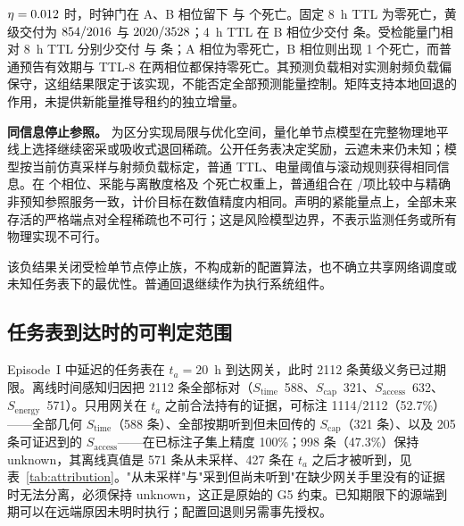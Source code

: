 \documentclass[11pt]{article}
\newcommand{\stime}{$S_{\mathrm{time}}$\xspace}
\newcommand{\scap}{$S_{\mathrm{cap}}$\xspace}
\newcommand{\senergy}{$S_{\mathrm{energy}}$\xspace}
\newcommand{\saccess}{$S_{\mathrm{access}}$\xspace}
\begin{document}
$\eta=0.012$ 时，时钟门在 A、B 相位留下 \cFiveNightfloorDeadA 与 \cFiveNightfloorDeadB 个死亡。固定 8~h TTL 为零死亡，黄级交付为 $854/2016$ 与 $2020/3528$；4~h TTL 在 B 相位少交付 \cFiveTtlFourLostB 条。受检能量门相对 8~h TTL 分别少交付 \cFiveEnergyLostA 与 \cFiveEnergyLostB 条；A 相位为零死亡，B 相位则出现 1 个死亡，而普通预告有效期与 TTL-8 在两相位都保持零死亡。其预测负载相对实测射频负载偏保守，这组结果限定于该实现，不能否定全部预测能量控制。矩阵支持本地回退的作用，未提供新能量推导租约的独立增量。

\textbf{同信息停止参照。} 为区分实现局限与优化空间，量化单节点模型在完整物理地平线上选择继续密采或吸收式退回稀疏。公开任务表决定奖励，云遮未来仍未知；模型按当前仿真采样与射频负载标定，普通 TTL、电量阈值与滚动规则获得相同信息。在 \cNineCells 个相位、采能与离散度格及 \cNineWeights 个死亡权重上，普通组合在 \cNineServiceMatches/\cNineComparisons 项比较中与精确非预知参照服务一致，计价目标在数值精度内相同。声明的紧能量点上，全部未来存活的严格端点对全程稀疏也不可行；这是风险模型边界，不表示监测任务或所有物理实现不可行。

该负结果关闭受检单节点停止族，不构成新的配置算法，也不确立共享网络调度或未知任务表下的最优性。普通回退继续作为执行系统组件。

\subsection{任务表到达时的可判定范围}
\label{sec:eval-attr}
Episode~I 中延迟的任务表在 $t_a{=}20$~h 到达网关，此时 2112 条黄级义务已过期限。离线时间感知归因把 2112 条全部标对（\stime~588、\scap~321、\saccess~632、\senergy~571）。只用网关在 $t_a$ 之前合法持有的证据，可标注 1114/2112（52.7\%）——全部几何 \stime（588 条）、全部按期听到但未回传的 \scap（321 条）、以及 205 条可证迟到的 \saccess——在已标注子集上精度 100\%；998 条（47.3\%）保持 unknown，其离线真值是 571 条从未采样、427 条在 $t_a$ 之后才被听到，见表~\ref{tab:attribution}。"从未采样"与"采到但尚未听到"在缺少网关手里没有的证据时无法分离，必须保持 unknown，这正是原始的 G5 约束。已知期限下的源端到期可以在远端原因未明时执行；配置回退则另需事先授权。

\begin{table}[t]
\centering\small
\caption{任务表到达网关时已经错过 2112 条升级义务的到达时刻归因（Episode~I）。在线投影器精确但部分；427 条匹配样本在 $t_a$ 之后才首次被听到，632 条晚于各自期限。}
\label{tab:attribution}
\setlength{\tabcolsep}{4pt}

\end{table}
\end{document}
